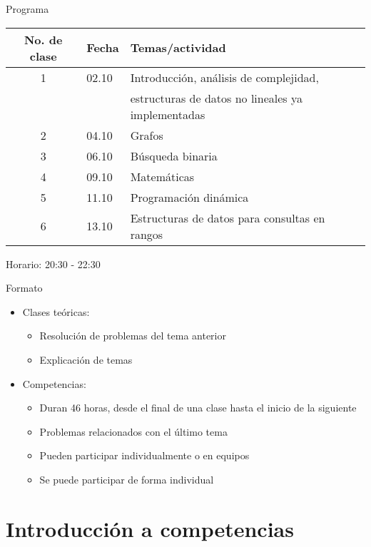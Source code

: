 \documentclass[10pt]{beamer}
\newcommand{\bi}{\begin{itemize}}
\newcommand{\ei}{\end{itemize}}
\begin{document}
\begin{frame}{Programa}
    \begin{center}
        \begin{tabular}{cl|l}

            No. de clase & Fecha & Temas/actividad \\
            \hline
            1 & 02.10 & Introducción, análisis de complejidad, \\ 
              &       & estructuras de datos no lineales ya implementadas \\
            2 & 04.10 & Grafos \\
            3 & 06.10 & Búsqueda binaria \\
            \hline
            4 & 09.10 & Matemáticas \\
            5 & 11.10 & Programación dinámica \\
            6 & 13.10 & Estructuras de datos para consultas en rangos \\
            \hline
        \end{tabular}
    \end{center}
    Horario: 20:30 - 22:30
\end{frame}

\begin{frame}{Formato}
    \bi
        \item Clases teóricas: 
        \bi
            \item Resolución de problemas del tema anterior
            \item Explicación de temas
        \ei
        \item Competencias:
        \bi
            \item Duran 46 horas, desde el final de una clase 
            hasta el inicio de la siguiente
            \item Problemas relacionados con el último tema
            \item Pueden participar individualmente o en equipos
            \item Se puede participar de forma individual
        \ei
    \ei
\end{frame}

\section{Introducción a competencias}
\end{document}
